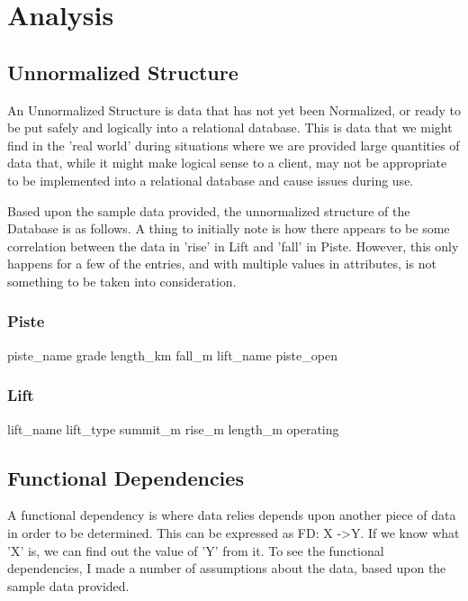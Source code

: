\documentclass[11pt]{scrartcl} %
\begin{document}
\section{Analysis}
\subsection{Unnormalized Structure}
An Unnormalized Structure is data that has not yet been Normalized, or ready to be put safely and logically into a relational database. This is data that we might find in the 'real world' during situations where we are provided large quantities of data that, while it might make logical sense to a client, may not be appropriate to be implemented into a relational database and cause issues during use.

Based upon the sample data provided\cite{sample}, the unnormalized structure of the Database is as follows. A thing to initially note is how there appears to be some correlation between the data in 'rise' in Lift and 'fall' in Piste. However, this only happens for a few of the entries, and with multiple values in attributes, is not something to be taken into consideration.

\subsubsection{Piste}
piste\_name\newline
grade\newline
length\_km\newline
fall\_m\newline
lift\_name\newline
piste\_open

\subsubsection{Lift}
lift\_name\newline
lift\_type\newline
summit\_m\newline
rise\_m\newline
length\_m\newline
operating

\subsection{Functional Dependencies}
A functional dependency is where data relies depends upon another piece of data in order to be determined. This can be expressed as FD: X -\textgreater \space Y. If we know what 'X' is, we can find out the value of 'Y' from it. To see the functional dependencies, I made a number of assumptions about the data, based upon the sample data provided.
\end{document}
